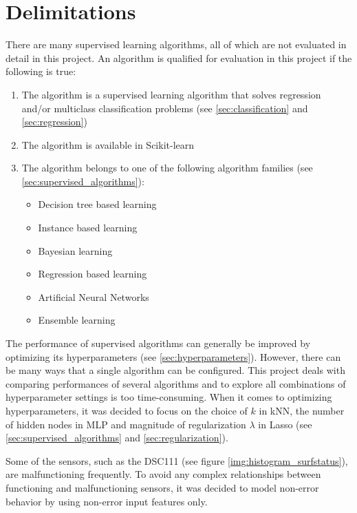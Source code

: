 \section{Delimitations} \label{sec:delimitations}
	There are many supervised learning algorithms, all of which are not evaluated in detail in this project. An algorithm is qualified for evaluation in this project if the following is true:
	\begin{enumerate}
		\item The algorithm is a supervised learning algorithm that solves regression and/or multiclass classification problems (see \ref{sec:classification} and \ref{sec:regression})
		\item The algorithm is available in Scikit-learn \cite{WEBSITE:15}
		\item The algorithm belongs to one of the following algorithm families (see \ref{sec:supervised_algorithms}):
			\begin{itemize}
				\item Decision tree based learning %
				\item Instance based learning %
				\item Bayesian learning %
				\item Regression based learning %
				\item Artificial Neural Networks %
				\item Ensemble learning %
			\end{itemize}
	\end{enumerate}

	The performance of supervised algorithms can generally be improved by optimizing its hyperparameters (see \ref{sec:hyperparameters}). However, there can be many ways that a single algorithm can be configured. This project deals with comparing performances of several algorithms and to explore all combinations of hyperparameter settings is too time-consuming. When it comes to optimizing hyperparameters, it was decided to focus on the choice of $k$ in kNN, the number of hidden nodes in MLP and magnitude of regularization $\lambda$ in Lasso (see \ref{sec:supervised_algorithms} and \ref{sec:regularization}).
 
	Some of the sensors, such as the DSC111 (see figure \ref{img:histogram_surfstatus}), are malfunctioning frequently. To avoid any complex relationships between functioning and malfunctioning sensors, it was decided to model non-error behavior by using non-error input features only. 

